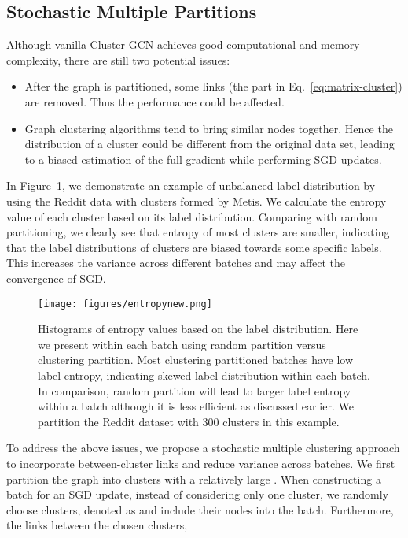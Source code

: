 \documentclass[sigconf]{acmart}
\begin{document}
\subsection{Stochastic Multiple Partitions}
\label{sec:multiple}
Although vanilla Cluster-GCN achieves good computational and memory complexity, there are still two potential issues: 
\begin{itemize}
    \item After the graph is partitioned, some links (the  part in Eq.~\eqref{eq:matrix-cluster}) are removed. Thus the performance could be affected.
    \item Graph clustering algorithms tend to bring similar nodes together. Hence the distribution of a cluster could be different from the original data set, leading to a biased estimation of the full gradient while performing SGD updates.
\end{itemize}
In Figure~\ref{fig:histogram}, we demonstrate an example of unbalanced label distribution by using the Reddit data with clusters formed by Metis.
We calculate the entropy value of each cluster based on its label distribution.
Comparing with random partitioning, we clearly see that entropy of most clusters are smaller, indicating that the label distributions of clusters are biased towards some specific labels.
This increases the variance across different batches and may affect the convergence of SGD. 
\begin{figure}
 \centering 
    \texttt{[image: figures/entropynew.png]}
    \caption{Histograms of entropy values based on the label distribution. Here we present  
    within each batch using random partition versus clustering partition. Most clustering partitioned batches have low label entropy, indicating skewed label distribution within each batch. In comparison, random partition will lead to larger label entropy within a batch although it is less efficient as discussed earlier. We partition the Reddit dataset with 300 clusters in this example.  \label{fig:histogram}}
    \vspace{-10pt}
\end{figure}



To address the above issues, we propose a stochastic multiple clustering approach to incorporate between-cluster links and reduce variance across batches.
We first partition the graph into  clusters  with a relatively large .
When constructing a batch  for an SGD update, instead of considering only one cluster, we randomly choose  clusters, denoted as  and include their nodes  into the batch.
Furthermore, the links between the chosen clusters, 
\end{document}
